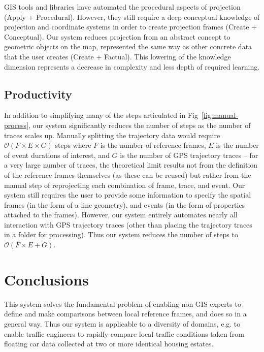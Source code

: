 GIS tools and libraries have automated the procedural aspects of projection (Apply + Procedural). However, they still require a deep conceptual knowledge of projection and coordinate systems in order to create projection frames (Create + Conceptual). Our system reduces projection from an abstract concept to geometric objects on the map, represented the same way as other concrete data that the user creates (Create + Factual). This lowering of the knowledge dimension represents a decrease in complexity and less depth of required learning.

\subsection{Productivity}

In addition to simplifying many of the steps articulated in Fig~\ref{fig:manual-process}, our system significantly reduces the number of steps as the number of traces scales up. Manually splitting the trajectory data would require $\mathcal{O}(F \times E \times G)$ steps where $F$ is the number of reference frames, $E$ is the number of event durations of interest, and $G$ is the number of GPS trajectory traces -- for a very large number of traces, the theoretical limit results not from the definition of the reference frames themselves (as these can be reused) but rather from the manual step of reprojecting each combination of frame, trace, and event. Our system still requires the user to provide some information to specify the spatial frames (in the form of a line geometry), and events (in the form of properties attached to the frames). However, our system entirely automates nearly all interaction with GPS trajectory traces (other than placing the trajectory traces in a folder for processing). Thus our system reduces the number of steps to $\mathcal{O}(F \times E + G)$.



\section{Conclusions}


This system solves the fundamental problem of enabling non GIS experts to define and make comparisons between local reference frames, and does so in a general way. Thus our system is applicable to a diversity of domains, e.g. to enable traffic engineers to rapidly compare local traffic conditions taken from floating car data collected at two or more identical housing estates.

